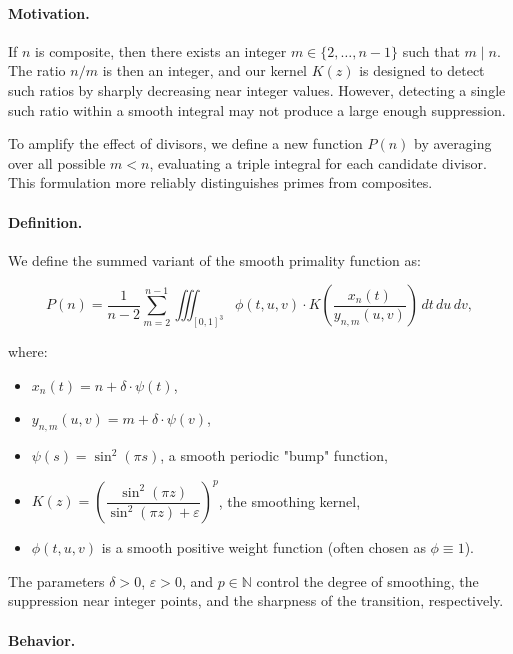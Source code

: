 \documentclass[12pt]{article}
\theoremstyle{definition}
\theoremstyle{plain}
\theoremstyle{remark}
\begin{document}
\paragraph{Motivation.}

If \( n \) is composite, then there exists an integer \( m \in \{2, \dots, n-1\} \) such that \( m \mid n \). The ratio \( n/m \) is then an integer, and our kernel \( K(z) \) is designed to detect such ratios by sharply decreasing near integer values. However, detecting a single such ratio within a smooth integral may not produce a large enough suppression.

To amplify the effect of divisors, we define a new function \( P(n) \) by averaging over all possible \( m < n \), evaluating a triple integral for each candidate divisor. This formulation more reliably distinguishes primes from composites.

\paragraph{Definition.}

We define the summed variant of the smooth primality function as:

\[
P(n) = \frac{1}{n - 2} \sum_{m = 2}^{n - 1}
\iiint_{[0,1]^3}
\phi(t, u, v) \cdot
K\left(
\frac{x_n(t)}{y_{n,m}(u,v)}
\right)
\, dt \, du \, dv,
\]

where:
\begin{itemize}
  \item \( x_n(t) = n + \delta \cdot \psi(t) \),
  \item \( y_{n,m}(u,v) = m + \delta \cdot \psi(v) \),
  \item \( \psi(s) = \sin^2(\pi s) \), a smooth periodic "bump" function,
  \item \( K(z) = \left( \dfrac{\sin^2(\pi z)}{\sin^2(\pi z) + \varepsilon} \right)^p \), the smoothing kernel,
  \item \( \phi(t, u, v) \) is a smooth positive weight function (often chosen as \( \phi \equiv 1 \)).
\end{itemize}

The parameters \( \delta > 0 \), \( \varepsilon > 0 \), and \( p \in \mathbb{N} \) control the degree of smoothing, the suppression near integer points, and the sharpness of the transition, respectively.

\paragraph{Behavior.}
\end{document}
